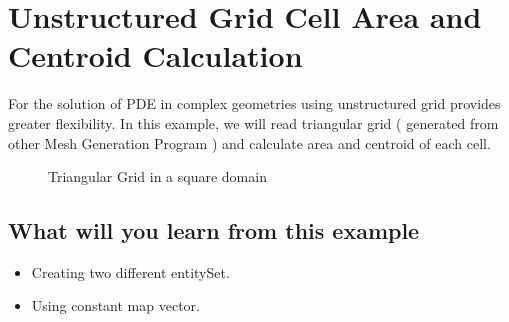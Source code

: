 \section {Unstructured Grid Cell Area and Centroid Calculation}
For the solution of PDE in complex geometries using unstructured grid
provides greater flexibility. In this example, we will read triangular
grid ( generated from other Mesh Generation Program ) and calculate
area and centroid of each cell.

\begin{figure}[h]
\vspace{3.75in}\caption {Triangular Grid in a square domain}
\end{figure}

\subsection { What will you learn from this example}
\begin{itemize}
\item  Creating two different entitySet.
\item  Using constant map vector.
\end{itemize}


